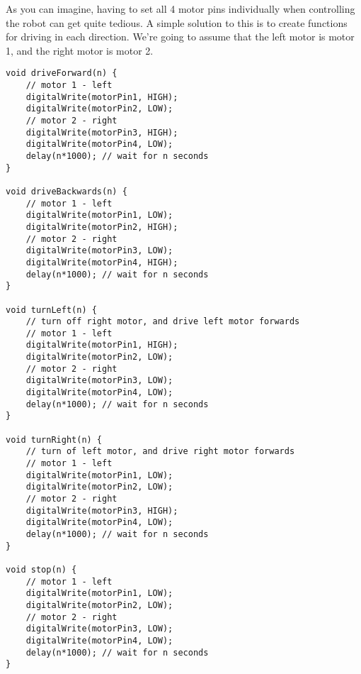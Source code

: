 \documentclass[../TinyBot.tex]{subfiles}
\begin{document}
As you can imagine, having to set all 4 motor pins individually when controlling the robot can get quite tedious. A simple solution to this is to create functions for driving in each direction. We're going to assume that the left motor is motor 1, and the right motor is motor 2.

\begin{lstlisting}
void driveForward(n) {
    // motor 1 - left
    digitalWrite(motorPin1, HIGH);
    digitalWrite(motorPin2, LOW);
    // motor 2 - right
    digitalWrite(motorPin3, HIGH);
    digitalWrite(motorPin4, LOW);
    delay(n*1000); // wait for n seconds
}

void driveBackwards(n) {
    // motor 1 - left
    digitalWrite(motorPin1, LOW);
    digitalWrite(motorPin2, HIGH);
    // motor 2 - right
    digitalWrite(motorPin3, LOW);
    digitalWrite(motorPin4, HIGH);
    delay(n*1000); // wait for n seconds
}

void turnLeft(n) {
    // turn off right motor, and drive left motor forwards
    // motor 1 - left
    digitalWrite(motorPin1, HIGH);
    digitalWrite(motorPin2, LOW);
    // motor 2 - right
    digitalWrite(motorPin3, LOW);
    digitalWrite(motorPin4, LOW);
    delay(n*1000); // wait for n seconds
}

void turnRight(n) {
    // turn of left motor, and drive right motor forwards
    // motor 1 - left
    digitalWrite(motorPin1, LOW);
    digitalWrite(motorPin2, LOW);
    // motor 2 - right
    digitalWrite(motorPin3, HIGH);
    digitalWrite(motorPin4, LOW);
    delay(n*1000); // wait for n seconds
}

void stop(n) {
    // motor 1 - left
    digitalWrite(motorPin1, LOW);
    digitalWrite(motorPin2, LOW);
    // motor 2 - right
    digitalWrite(motorPin3, LOW);
    digitalWrite(motorPin4, LOW);
    delay(n*1000); // wait for n seconds
}
\end{lstlisting}
\end{document}
